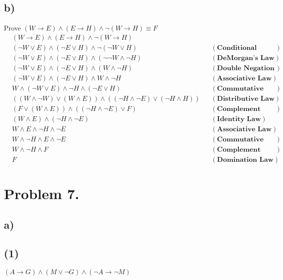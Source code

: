 \documentclass{article}
\begin{document}
\subsection*{b)}
Prove $(W \rightarrow E) \land (E \rightarrow H) \land \neg (W \rightarrow H) \equiv F$ \\ \hline
\begin{align*}
    & (W \rightarrow E) \land (E \rightarrow H) \land \neg (W \rightarrow H) \\
    & ( \neg W \lor E) \land ( \neg E \lor H) \land \neg (\neg W \lor H) & &(\textbf{Conditional Identity}) \\
    & ( \neg W \lor E) \land ( \neg E \lor H) \land (\neg \neg W \land \neg H) & &(\textbf{DeMorgan's Law}) \\
    & ( \neg W \lor E) \land ( \neg E \lor H) \land (W \land \neg H) & &(\textbf{Double Negation Law}) \\
    & ( \neg W \lor E) \land ( \neg E \lor H) \land W \land \neg H & &(\textbf{Associative Law}) \\
    & W \land ( \neg W \lor E) \land \neg H \land ( \neg E \lor H) & &(\textbf{Commutative Law}) \\
    & ((W \land \neg W) \lor (W \land E)) \land ((\neg H \land \neg E) \lor (\neg H \land H)) & &(\textbf{Distributive Law}) \\
    & (F \lor (W \land E)) \land ((\neg H \land \neg E) \lor F) & &(\textbf{Complement Law}) \\
    & (W \land E) \land (\neg H \land \neg E) & &(\textbf{Identity Law}) \\
    & W \land E \land \neg H \land \neg E & &(\textbf{Associative Law}) \\
    & W \land \neg H \land E \land \neg E & &(\textbf{Commutative Law}) \\
    & W \land \neg H \land F & &(\textbf{Complement Law}) \\
    & F & &(\textbf{Domination Law})
\end{align*}
\clearpage
\section*{Problem 7.}
\subsection*{a)}
\subsection*{(1)}
$(A \rightarrow G) \land (M \lor \neg G) \land (\neg A \rightarrow \neg M)$
\end{document}
